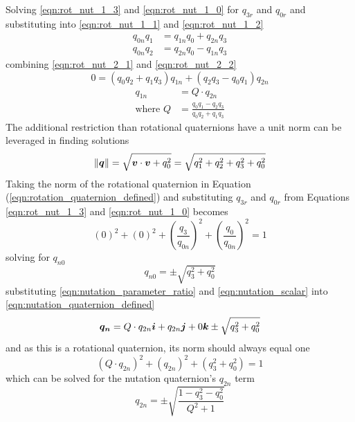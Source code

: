 Solving \ref{eqn:rot_nut_1_3} and \ref{eqn:rot_nut_1_0} for $q_{3r}$ and $q_{0r}$ and substituting into \ref{eqn:rot_nut_1_1} and \ref{eqn:rot_nut_1_2}
\begin{subequations}
  \begin{align}
    q_{0n} q_{1} &= q_{1n} q_{0} + q_{2n} q_{3} \label{eqn:rot_nut_2_1} \\
    q_{0n} q_{2} &= q_{2n} q_{0} - q_{1n} q_{3} \label{eqn:rot_nut_2_2}
  \end{align}
\end{subequations}
combining \ref{eqn:rot_nut_2_1} and \ref{eqn:rot_nut_2_2}
\begin{equation}
  0 = (q_{0}q_{2} + q_{1}q_{3}) q_{1n} + (q_{2}q_{3} - q_{0}q_{1}) q_{2n}
\end{equation}
\begin{subequations}
  \begin{align}
    q_{1n} &= Q \cdot q_{2n} \\
    \text{where } Q &= \frac{q_{0}q_{1} - q_{2}q_{3}}{q_{0}q_{2} + q_{1}q_{3}}
  \end{align}
  \label{eqn:nutation_parameter_ratio}
\end{subequations}
The additional restriction than rotational quaternions have a unit norm can be leveraged in finding solutions
\begin{equation}
  \left\| \boldsymbol{q} \right\| = \sqrt{\boldsymbol{v} \cdot \boldsymbol{v} + q_0^2} = \sqrt{q_1^2+q_2^2+q_3^2+q_0^2}
  \label{eqn:quaternion_norm}
\end{equation}
Taking the norm of the rotational quaternion in Equation (\ref{eqn:rotation_quaternion_defined}) and substituting $q_{3r}$ and $q_{0r}$ from Equations \ref{eqn:rot_nut_1_3} and \ref{eqn:rot_nut_1_0} becomes
\begin{equation}
  (0)^2 + (0)^2 + \left( \frac{q_3}{q_{0n}} \right)^2 + \left( \frac{q_0}{q_{0n}} \right)^2 = 1
\end{equation}
solving for $q_{n0}$
\begin{equation}
  q_{n0} = \pm \sqrt{q_3^2 + q_0^2}
  \label{eqn:nutation_scalar}
\end{equation}
substituting \ref{eqn:nutation_parameter_ratio} and \ref{eqn:nutation_scalar} into \ref{eqn:nutation_quaternion_defined}
\begin{equation}
  \boldsymbol{q_{n}}
  = Q \cdot q_{2n} \boldsymbol{i} + q_{2n} \boldsymbol{j} + 0 \boldsymbol{k} \pm \sqrt{q_3^2 + q_0^2}
\end{equation}
and as this is a rotational quaternion, its norm should always equal one
\begin{equation}
  (Q \cdot q_{2n})^2 + (q_{2n})^2 + (q_3^2 + q_0^2) = 1
\end{equation}
which can be solved for the nutation quaternion's $q_{2n}$ term
\begin{equation}
  q_{2n} = \pm \sqrt{ \frac{1  - q_3^2 - q_0^2}{Q^2 + 1} }
  \label{eqn:qn2_solution}
\end{equation}

